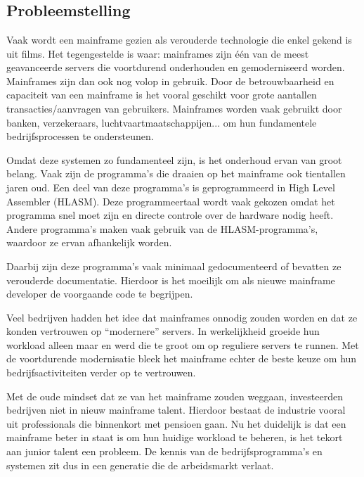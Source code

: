 
\chapter{}%
\label{ch:inleiding}

\section{Probleemstelling}
\label{sec:probleemstelling}

Vaak wordt een mainframe gezien als verouderde technologie die enkel gekend is uit films. Het tegengestelde is waar: mainframes zijn één van de meest geavanceerde servers die voortdurend onderhouden en gemoderniseerd worden. Mainframes zijn dan ook nog volop in gebruik. Door de betrouwbaarheid en capaciteit van een mainframe is het vooral geschikt voor grote aantallen transacties/aanvragen van gebruikers. Mainframes worden vaak gebruikt door banken, verzekeraars, luchtvaartmaatschappijen... om hun fundamentele bedrijfsprocessen te ondersteunen.

Omdat deze systemen zo fundamenteel zijn, is het onderhoud ervan van groot belang. Vaak zijn de programma's die draaien op het mainframe ook tientallen jaren oud. Een deel van deze programma's is geprogrammeerd in High Level Assembler (HLASM). Deze programmeertaal wordt vaak gekozen omdat het programma snel moet zijn en directe controle over de hardware nodig heeft. Andere programma's maken vaak gebruik van de HLASM-programma's, waardoor ze ervan afhankelijk worden. 

Daarbij zijn deze programma's vaak minimaal gedocumenteerd of bevatten ze verouderde documentatie. Hierdoor is het moeilijk om als nieuwe mainframe developer de voorgaande code te begrijpen. 

Veel bedrijven hadden het idee dat mainframes onnodig zouden worden en dat ze konden vertrouwen op “modernere” servers. In werkelijkheid groeide hun workload alleen maar en werd die te groot om op reguliere servers te runnen. Met de voortdurende modernisatie bleek het mainframe echter de beste keuze om hun bedrijfsactiviteiten verder op te vertrouwen.  

\newpage

Met de oude mindset dat ze van het mainframe zouden weggaan, investeerden bedrijven niet in nieuw mainframe talent. Hierdoor bestaat de industrie vooral uit professionals die binnenkort met pensioen gaan. Nu het duidelijk is dat een mainframe beter in staat is om hun huidige workload te beheren, is het tekort aan junior talent een probleem. De kennis van de bedrijfsprogramma's en systemen zit dus in een generatie die de arbeidsmarkt verlaat. 

